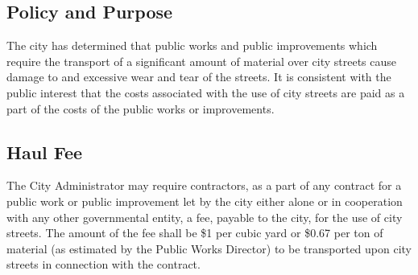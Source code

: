 \subsection{Policy and Purpose}
The city has determined that public works and public improvements which require the transport of a significant amount of material over city streets cause damage to and excessive wear and tear of the streets.  It is consistent with the public interest that the costs associated with the use of city streets are paid as a part of the costs of the public works or improvements.
\subsection{Haul Fee}
The City Administrator may require contractors, as a part of any contract for a public work or public improvement let by the city either alone or in cooperation with any other governmental entity, a fee, payable to the city, for the use of city streets.  The amount of the fee shall be \$1 per cubic yard or \$0.67 per ton of material (as estimated by the Public Works Director) to be transported upon city streets in connection with the contract.

\setcounter{section}{98}

